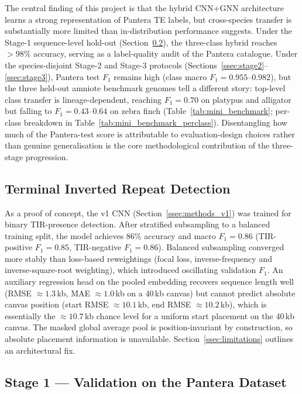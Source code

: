 \documentclass[12pt]{article}
\begin{document}
The central finding of this project is that the hybrid CNN+GNN architecture learns a strong representation of Pantera TE labels, but cross-species transfer is substantially more limited than in-distribution performance suggests. Under the Stage-1 sequence-level hold-out (Section~\ref{ssec:stage1}), the three-class hybrid reaches $>98\%$ accuracy, serving as a label-quality audit of the Pantera catalogue. Under the species-disjoint Stage-2 and Stage-3 protocols (Sections~\ref{ssec:stage2}--\ref{ssec:stage3}), Pantera test $F_1$ remains high (class macro $F_1 = 0.955$--$0.982$), but the three held-out amniote benchmark genomes tell a different story: top-level class transfer is lineage-dependent, reaching $F_1 = 0.70$ on platypus and alligator but falling to $F_1 = 0.43$--$0.64$ on zebra finch (Table~\ref{tab:mini_benchmark}; per-class breakdown in Table~\ref{tab:mini_benchmark_perclass}). Disentangling how much of the Pantera-test score is attributable to evaluation-design choices rather than genuine generalisation is the core methodological contribution of the three-stage progression.

\subsection{Terminal Inverted Repeat Detection}\label{ssec:tir}

As a proof of concept, the v1 CNN (Section~\ref{ssec:methods_v1}) was trained for binary TIR-presence detection. After stratified subsampling to a balanced training split, the model achieves 86\% accuracy and macro $F_1 = 0.86$ (TIR-positive $F_1 = 0.85$, TIR-negative $F_1 = 0.86$). Balanced subsampling converged more stably than loss-based reweightings (focal loss, inverse-frequency and inverse-square-root weighting), which introduced oscillating validation $F_1$. An auxiliary regression head on the pooled embedding recovers sequence length well (RMSE $\approx 1.3$\,kb, MAE $\approx 1.0$\,kb on a 40\,kb canvas) but cannot predict absolute canvas position (start RMSE $\approx 10.1$\,kb, end RMSE $\approx 10.2$\,kb), which is essentially the $\approx 10.7$\,kb chance level for a uniform start placement on the 40\,kb canvas. The masked global average pool is position-invariant by construction, so absolute placement information is unavailable. Section~\ref{ssec:limitations} outlines an architectural fix.

\subsection{Stage 1 --- Validation on the Pantera Dataset}\label{ssec:stage1}
\end{document}
